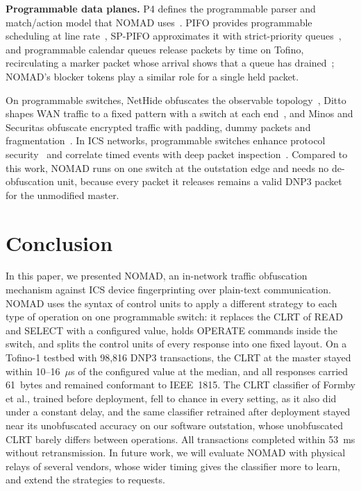 \documentclass[conference]{IEEEtran}
\begin{document}
\textbf{Programmable data planes.} P4 defines the programmable parser and match/action model that NOMAD uses~\cite{p4ccr2014}. PIFO provides programmable scheduling at line rate~\cite{pifo2016}, SP-PIFO approximates it with strict-priority queues~\cite{sppifo2020}, and programmable calendar queues release packets by time on Tofino, recirculating a marker packet whose arrival shows that a queue has drained~\cite{calendarq2020}; NOMAD's blocker tokens play a similar role for a single held packet.

On programmable switches, NetHide obfuscates the observable topology~\cite{nethide2018}, Ditto shapes WAN traffic to a fixed pattern with a switch at each end~\cite{ditto2022}, and Minos and Securitas obfuscate encrypted traffic with padding, dummy packets and fragmentation~\cite{minos2025,securitas2026}. In ICS networks, programmable switches enhance protocol security~\cite{hulin2023} and correlate timed events with deep packet inspection~\cite{idetect2026}. Compared to this work, NOMAD runs on one switch at the outstation edge and needs no de-obfuscation unit, because every packet it releases remains a valid DNP3 packet for the unmodified master.
\FloatBarrier
\section{Conclusion}
\label{sec:conclusion}

In this paper, we presented NOMAD, an in-network traffic obfuscation mechanism against ICS device fingerprinting over plain-text communication. NOMAD uses the syntax of control units to apply a different strategy to each type of operation on one programmable switch: it replaces the CLRT of READ and SELECT with a configured value, holds OPERATE commands inside the switch, and splits the control units of every response into one fixed layout. On a Tofino-1 testbed with 98,816 DNP3 transactions, the CLRT at the master stayed within 10--16~$\mu$s of the configured value at the median, and all responses carried 61~bytes and remained conformant to IEEE~1815. The CLRT classifier of Formby et al., trained before deployment, fell to chance in every setting, as it also did under a constant delay, and the same classifier retrained after deployment stayed near its unobfuscated accuracy on our software outstation, whose unobfuscated CLRT barely differs between operations. All transactions completed within 53~ms without retransmission. In future work, we will evaluate NOMAD with physical relays of several vendors, whose wider timing gives the classifier more to learn, and extend the strategies to requests.
\end{document}
